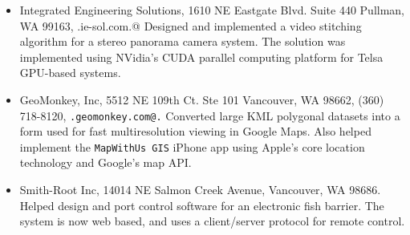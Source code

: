 \documentclass[10pt]{article}
\begin{document}
%

\vspace{0.25cm}


\begin{itemize}

\item Integrated Engineering Solutions, 
1610 NE Eastgate Blvd.
Suite 440
Pullman, WA 99163,
\verb@www.ie-sol.com.@
Designed and implemented a video stitching algorithm for
a stereo panorama camera system. The solution was
implemented using NVidia's CUDA parallel computing platform
for Telsa GPU-based systems.


\item GeoMonkey, Inc, 
5512 NE 109th Ct. Ste 101
Vancouver, WA 98662,
(360) 718-8120,
{\tt \verb@www.geomonkey.com@.}  
  Converted large KML polygonal datasets into a form used for
  fast multiresolution viewing in Google Maps.
  Also helped implement the {\tt MapWithUs GIS} iPhone app using Apple's core location technology
  and Google's map API.
\item Smith-Root Inc, 14014 NE Salmon Creek Avenue, Vancouver, WA 98686.\\
Helped design and port control software for an
electronic fish barrier. The system is now web based, and uses a 
client/server protocol for remote control.
\end{itemize}
\end{document}
